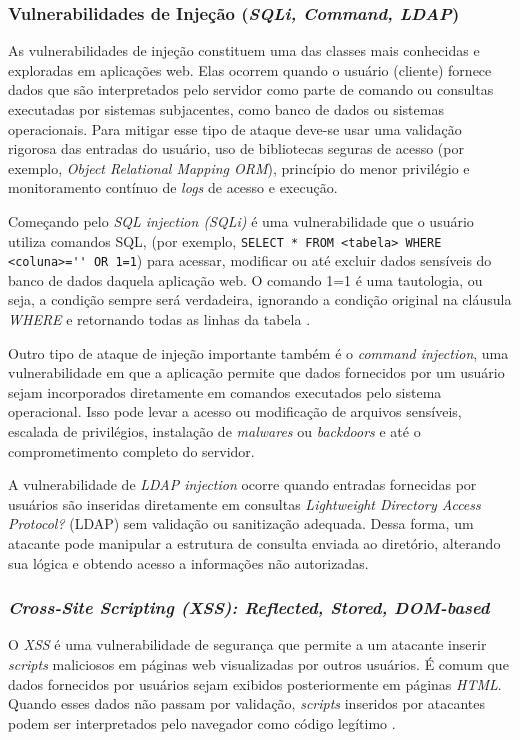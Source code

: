 \subsubsection{
    Vulnerabilidades de Injeção (\textit{SQLi, Command, LDAP})
}

As vulnerabilidades de injeção constituem uma das classes mais conhecidas e exploradas em aplicações web. Elas ocorrem quando o usuário (cliente) fornece dados que são interpretados pelo servidor como parte de comando ou consultas executadas por sistemas subjacentes, como banco de dados ou sistemas operacionais. Para mitigar esse tipo de ataque deve-se usar uma validação rigorosa das entradas do usuário, uso de bibliotecas seguras de acesso (por exemplo, \textit{Object Relational Mapping \- ORM}), princípio do menor privilégio e monitoramento contínuo de \textit{logs} de acesso e execução. 

Começando pelo \textit{SQL injection (SQLi)} é uma vulnerabilidade que o usuário utiliza comandos SQL, (por exemplo, \verb|SELECT * FROM <tabela> WHERE <coluna>='' OR 1=1|) para acessar, modificar ou até excluir dados sensíveis do banco de dados daquela aplicação web. O comando 1=1 é uma tautologia, ou seja, a condição sempre será verdadeira, ignorando a condição original na cláusula \textit{WHERE} e retornando todas as linhas da tabela \cite{appelt:2014}. 

Outro tipo de ataque de injeção importante também é o \textit{command injection}, uma vulnerabilidade em que a aplicação permite que dados fornecidos por um usuário sejam incorporados diretamente em comandos executados pelo sistema operacional. Isso pode levar a acesso ou modificação de arquivos sensíveis, escalada de privilégios, instalação de \textit{malwares} ou \textit{backdoors} e até o comprometimento completo do servidor. 

A vulnerabilidade de \textit{LDAP injection} ocorre quando entradas fornecidas por usuários são inseridas diretamente em consultas \textit{Lightweight Directory Access Protocol?} (LDAP) sem validação ou sanitização adequada. Dessa forma, um atacante pode manipular a estrutura de consulta enviada ao diretório, alterando sua lógica e obtendo acesso a informações não autorizadas.  

\subsubsection{
    \textit{Cross-Site Scripting (XSS): Reflected, Stored, DOM-based}
}
O \textit{XSS} é uma vulnerabilidade de segurança que permite a um atacante inserir \textit{scripts} maliciosos em páginas web visualizadas por outros usuários. É comum que dados fornecidos por usuários sejam exibidos posteriormente em páginas \textit{HTML}. Quando esses dados não passam por validação, \textit{scripts} inseridos por atacantes podem ser interpretados pelo navegador como código legítimo \cite{sarmah:2018}. 

